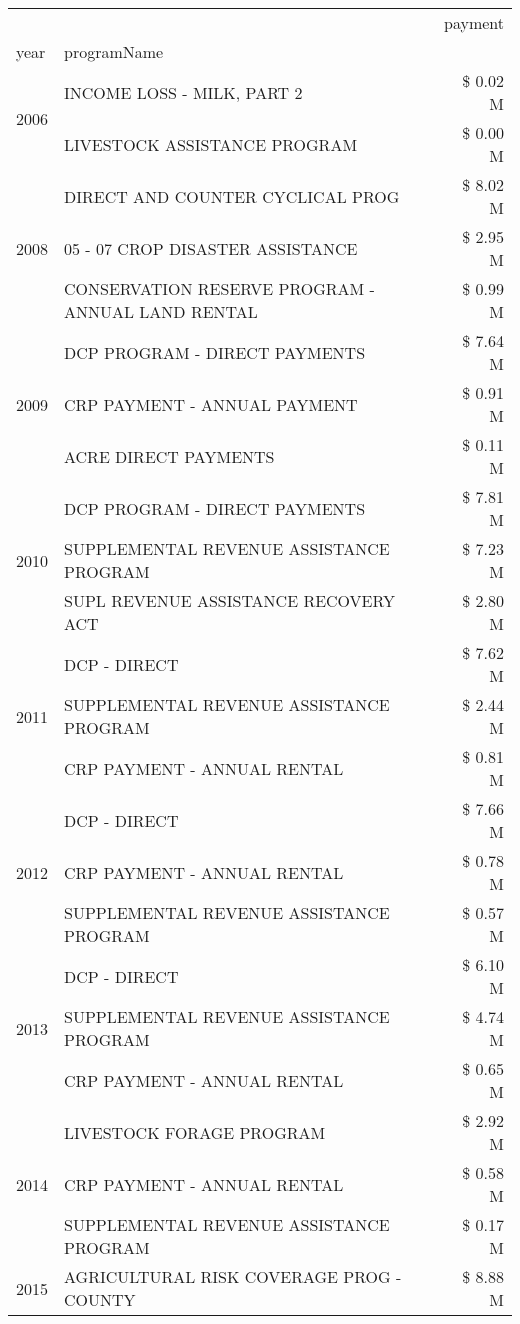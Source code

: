 \begin{tabular}{llr}
\toprule
 &  & payment \\
year & programName &  \\
\midrule
\multirow[t]{2}{*}{2006} & INCOME LOSS - MILK, PART 2 & \$ 0.02 M \\
 & LIVESTOCK ASSISTANCE PROGRAM & \$ 0.00 M \\
\cline{1-3}
\multirow[t]{3}{*}{2008} & DIRECT AND COUNTER CYCLICAL PROG & \$ 8.02 M \\
 & 05 - 07 CROP DISASTER ASSISTANCE & \$ 2.95 M \\
 & CONSERVATION RESERVE PROGRAM - ANNUAL LAND RENTAL & \$ 0.99 M \\
\cline{1-3}
\multirow[t]{3}{*}{2009} & DCP PROGRAM - DIRECT PAYMENTS & \$ 7.64 M \\
 & CRP PAYMENT - ANNUAL PAYMENT & \$ 0.91 M \\
 & ACRE DIRECT PAYMENTS & \$ 0.11 M \\
\cline{1-3}
\multirow[t]{3}{*}{2010} & DCP PROGRAM - DIRECT PAYMENTS & \$ 7.81 M \\
 & SUPPLEMENTAL REVENUE ASSISTANCE PROGRAM & \$ 7.23 M \\
 & SUPL REVENUE ASSISTANCE RECOVERY ACT & \$ 2.80 M \\
\cline{1-3}
\multirow[t]{3}{*}{2011} & DCP - DIRECT & \$ 7.62 M \\
 & SUPPLEMENTAL REVENUE ASSISTANCE PROGRAM & \$ 2.44 M \\
 & CRP PAYMENT - ANNUAL RENTAL & \$ 0.81 M \\
\cline{1-3}
\multirow[t]{3}{*}{2012} & DCP - DIRECT & \$ 7.66 M \\
 & CRP PAYMENT - ANNUAL RENTAL & \$ 0.78 M \\
 & SUPPLEMENTAL REVENUE ASSISTANCE PROGRAM & \$ 0.57 M \\
\cline{1-3}
\multirow[t]{3}{*}{2013} & DCP - DIRECT & \$ 6.10 M \\
 & SUPPLEMENTAL REVENUE ASSISTANCE PROGRAM & \$ 4.74 M \\
 & CRP PAYMENT - ANNUAL RENTAL & \$ 0.65 M \\
\cline{1-3}
\multirow[t]{3}{*}{2014} & LIVESTOCK FORAGE PROGRAM & \$ 2.92 M \\
 & CRP PAYMENT - ANNUAL RENTAL & \$ 0.58 M \\
 & SUPPLEMENTAL REVENUE ASSISTANCE PROGRAM & \$ 0.17 M \\
\cline{1-3}
\multirow[t]{3}{*}{2015} & AGRICULTURAL RISK COVERAGE PROG - COUNTY & \$ 8.88 M \\

\end{tabular}
